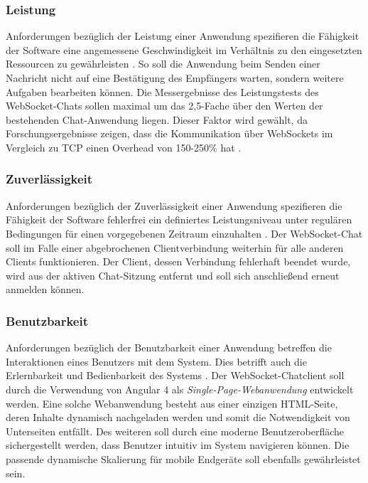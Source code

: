\documentclass[11pt,a4paper,titlepage]{scrartcl}
\numberwithin{equation}{section}
\begin{document}
\subsubsection*{Leistung}
Anforderungen bezüglich der Leistung einer Anwendung spezifieren die Fähigkeit der Software eine angemessene Geschwindigkeit im Verhältnis zu den eingesetzten Ressourcen zu gewährleisten \autocite[315]{mairiza_investigation_2010}. So soll die Anwendung beim Senden einer Nachricht nicht auf eine Bestätigung des Empfängers warten, sondern weitere Aufgaben bearbeiten können. Die Messergebnisse des Leistungstests des WebSocket-Chats sollen maximal um das 2,5-Fache über den Werten der bestehenden Chat-Anwendung liegen. Dieser Faktor wird gewählt, da Forschungsergebnisse zeigen, dass die Kommunikation über WebSockets im Vergleich zu TCP einen Overhead von 150-250\% hat \autocite[1007]{skvorc_performance_2014}.

\subsubsection*{Zuverlässigkeit}
Anforderungen bezüglich der Zuverlässigkeit einer Anwendung spezifieren die Fähigkeit der Software fehlerfrei ein definiertes Leistungsniveau unter regulären Bedingungen für einen vorgegebenen Zeitraum einzuhalten \autocite[315]{mairiza_investigation_2010}. Der WebSocket-Chat soll im Falle einer abgebrochenen Clientverbindung weiterhin für alle anderen Clients funktionieren. Der Client, dessen Verbindung fehlerhaft beendet wurde, wird aus der aktiven Chat-Sitzung entfernt und soll sich anschließend erneut anmelden können.

\subsubsection*{Benutzbarkeit}
Anforderungen bezüglich der Benutzbarkeit einer Anwendung betreffen die Interaktionen eines Benutzers mit dem System. Dies betrifft auch die Erlernbarkeit und Bedienbarkeit des Systems \autocite[315]{mairiza_investigation_2010}. Der WebSocket-Chatclient soll durch die Verwendung von Angular 4 als \textit{Single-Page-Webanwendung} entwickelt werden. Eine solche Webanwendung besteht aus einer einzigen HTML-Seite, deren Inhalte dynamisch nachgeladen werden und somit die Notwendigkeit von Unterseiten entfällt. Des weiteren soll durch eine moderne Benutzeroberfläche sichergestellt werden, dass Benutzer intuitiv im System navigieren können. Die passende dynamische Skalierung für mobile Endgeräte soll ebenfalls gewährleistet sein.
\end{document}
